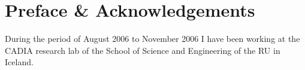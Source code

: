 \chapter*{Preface \& Acknowledgements}

During the period of August 2006 to November 2006 I have been working at the
\ac{CADIA} research lab of the School of Science and Engineering of the
\ac{RU} in Iceland.

